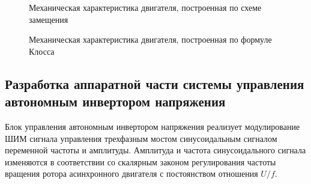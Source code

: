         \begin{figure}[h!]
            \caption{Механическая характеристика двигателя, построенная по схеме замещения}
            \label{fig:motor-mh1}
        \end{figure}

        \begin{figure}[h!]
            \caption{Механическая характеристика двигателя, построенная по формуле Клосса}
            \label{fig:motor-mh2}
        \end{figure}

    \subsection{Разработка аппаратной части системы управления автономным
        инвертором напряжения}


        Блок управления автономным инвертором напряжения реализует
        модулирование ШИМ сигнала управления трехфазным мостом синусоидальным
        сигналом переменной частоты и амплитуды. Амплитуда и частота
        синусоидального сигнала изменяются в соответствии со скалярным законом
        регулирования частоты вращения ротора асинхронного двигателя с
        постоянством отношения $U/f$.

